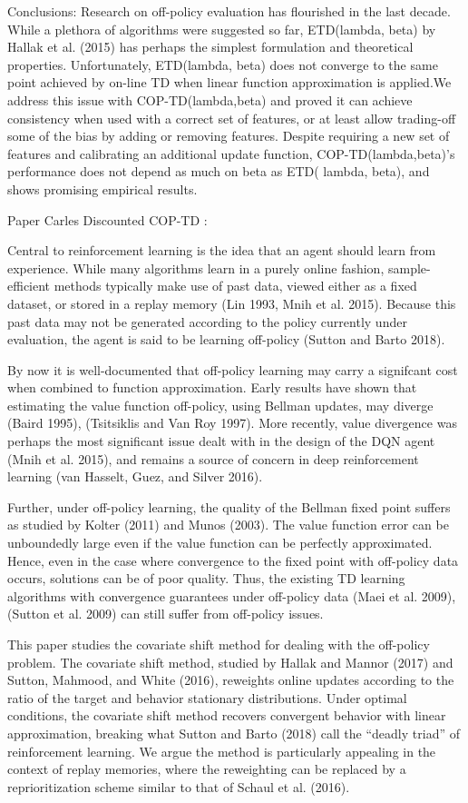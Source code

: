 \documentclass[12pt,a4paper,openright,twoside]{article}
\numberwithin{equation}{section}
\theoremstyle{definition}
\theoremstyle{remark}
\theoremstyle{plain}
\begin{document}
Conclusions: Research on off-policy evaluation has flourished in the last decade. While a plethora of algorithms were suggested so far, ETD(lambda, beta) by Hallak et al. (2015) has perhaps the simplest formulation and theoretical properties. Unfortunately, ETD(lambda, beta) does not converge to the same point achieved by on-line TD when linear function approximation is applied.We address this issue with COP-TD(lambda,beta) and proved it can achieve consistency when used with a correct set of features, or at least allow trading-off some of the bias by adding or removing features. Despite requiring a new set of features and calibrating an additional update function, COP-TD(lambda,beta)’s performance does not depend as much on beta as ETD( lambda, beta), and shows promising empirical results.

Paper Carles Discounted COP-TD \cite{DCOPTD}:

Central to reinforcement learning is the idea that an agent should learn from experience. While many algorithms learn in a purely online fashion, sample-efficient methods typically make use of past data, viewed either as a fixed dataset, or stored in a replay memory (Lin 1993, Mnih et al. 2015). Because this past data may not be generated according to the policy currently under evaluation, the agent is said to be learning off-policy (Sutton and Barto 2018).

By now it is well-documented that off-policy learning may carry a signifcant cost when combined to function approximation. Early results have shown that estimating the value function off-policy, using Bellman updates, may diverge (Baird 1995), (Tsitsiklis and Van Roy 1997). More recently, value divergence was perhaps the most significant issue dealt with in the design of the DQN agent (Mnih et al. 2015), and remains a source of concern in deep reinforcement learning (van Hasselt, Guez, and Silver 2016).

Further, under off-policy learning, the quality of the Bellman fixed point suffers as studied by Kolter (2011) and Munos (2003). The value function error can be unboundedly large even if the value function can be perfectly approximated. Hence, even in the case where convergence to the fixed point with off-policy data occurs, solutions can be of poor quality. Thus, the existing TD learning algorithms with convergence guarantees under off-policy data (Maei et al. 2009), (Sutton et al. 2009) can still suffer from off-policy issues.

This paper studies the covariate shift method for dealing with the off-policy problem. The covariate shift method, studied by Hallak and Mannor (2017) and Sutton, Mahmood, and White (2016), reweights online updates according to the ratio of the target and behavior stationary distributions. Under optimal conditions, the covariate shift method recovers convergent behavior with linear approximation, breaking what Sutton and Barto (2018) call the “deadly triad” of reinforcement learning. We argue the method is particularly appealing in the context of replay memories, where the reweighting can be replaced by a reprioritization scheme similar to that of Schaul et al. (2016).
\end{document}
